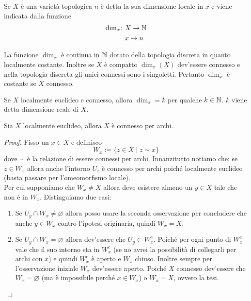 \begin{definition}
	Se $X$ è una varietà topologica $n$ è detta la sua dimensione locale in $x$ e viene indicata dalla funzione
	\begin{equation}
	\begin{aligned}	
	\dim_x	\colon & X \rightarrow \mathbb{N} \\
	& 	x	\mapsto n \\
	\end{aligned}
	\end{equation}
\end{definition}

\begin{definition}
	La funzione $\dim_x$ è continua in $\mathbb{N}$ dotato della topologia discreta in quanto localmente costante. Inoltre se $X$ è compatto $\dim_x(X)$ dev'essere connesso e nella topologia discreta gli unici connessi sono i singoletti. Pertanto $\dim_x$ è costante se $X$ connesso.
\end{definition}

\begin{corollary}
	Se $X$ localmente euclideo e connesso, allora $\dim_x = k$ per qualche $k \in \mathbb{N}$. $k$ viene detta dimensione reale di $X$.
\end{corollary}

\begin{theorem}
	Sia $X$ localmente euclideo, allora $X$ è connesso per archi. 
\end{theorem} 
\begin{proof}
	Fisso un $x \in X$ e definisco 
	\begin{equation}
	W_x := \{z \in X \;|\; z \sim x\}
	\end{equation}
	dove $\sim$ è la relazione di essere connessi per archi. Innanzitutto notiamo che: 
	se $z \in W_x$ allora anche l'intorno $U_z$ è connesso per archi poiché localmente euclideo (basta passare per l'omeomorfismo locale).\\
	
	Per cui supponiamo che $W_x \neq X$ allora deve esistere almeno un $y \in X$ tale che non è in $W_x$. Distinguiamo due casi: 
	\begin{enumerate}
		\item Se $U_y \cap W_x \neq \varnothing$ allora posso usare la seconda osservazione per concludere che anche $y \in W_x$ contro l'ipotesi originaria, quindi $W_x = X$.
		\item Se $U_y \cap W_x = \varnothing$ allora dev'essere che $U_y \subset W^c_x$. Poiché per ogni punto di $W^c_x$ vale che il suo intorno sta in $W^c_x$ (se no avrei la possibilità di collegarli per archi con $x$) e quindi $W^c_x$ è aperto e $W_x$ chiuso. Inoltre sempre per l'osservazione iniziale $W_x$ dev'essere aperto. Poiché $X$ connesso dev'essere che $W_x = \varnothing$ (ma è impossibile perché $x\in W_x$) o $W_x = X$, ovvero la tesi. 
	\end{enumerate}
\end{proof}


